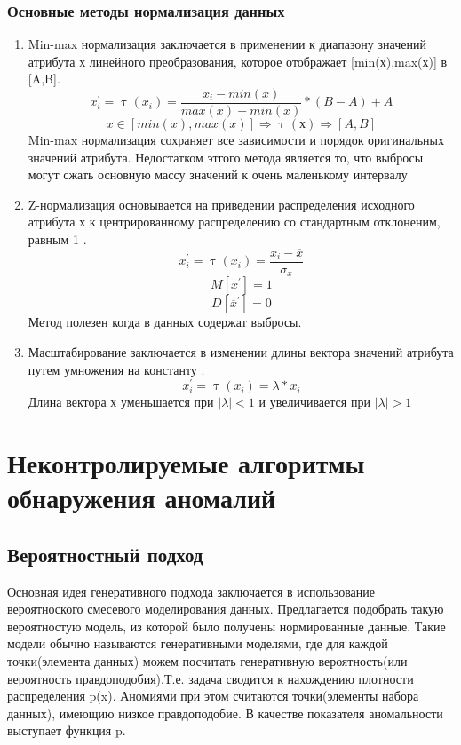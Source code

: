 \subsubsection{Основные методы нормализация данных}
\begin{enumerate}
	\item Min-max нормализация заключается в применении к диапазону значений атрибута х линейного преобразования, которое отображает [min(х),max(х)] в [A,B].
	\begin{equation}
	x^\prime_i=\uptau(x_i)=\frac{x_i - min(x)}{max(x) - min(x)}*(B-A) + A
		\end{equation}
   \begin{equation}
		x \in[min(x), max(x)] \Rightarrow \uptau(х) \Rightarrow [A,B]
	\end{equation}
	Min-max нормализация сохраняет все зависимости и порядок оригинальных значений атрибута. Недостатком этгого метода является то, что выбросы могут сжать основную массу значений к очень маленькому интервалу
	\item Z-нормализация  основывается на приведении распределения исходного атрибута х  к центрированному распределению со стандартным отклоненим, равным 1 \cite{Book06} .
	\begin{equation}
	x^\prime_i=\uptau(x_i) =\frac{x_i - \overline{x}}{\sigma_x}
		\end{equation}
		\begin{equation}
		M[x^\prime]=1	 
		\end{equation}
		\begin{equation}
		D[\overline{x}^\prime]=0	 
		\end{equation}
		Метод полезен когда в данных содержат выбросы.
	\item Масштабирование заключается в изменении длины вектора значений атрибута путем умножения на константу \cite{Book06} .
	\begin{equation}
	x^\prime_i=\uptau(x_i)=\lambda*x_i
	\end{equation}
	Длина вектора х уменьшается при $|\lambda|<1$ и увеличивается при $|\lambda|>1$ 
\end{enumerate}
\section{Неконтролируемые алгоритмы обнаружения аномалий}
\subsection{Вероятностный подход}
Основная идея генеративного подхода заключается в использование вероятноского смесевого моделирования данных. Предлагается подобрать такую вероятностую модель, из которой было получены нормированные данные. Такие модели обычно называются генеративными моделями, где для каждой точки(элемента данных) можем посчитать генеративную вероятность(или вероятность правдоподобия).Т.е. задача  сводится к нахождению плотности распределения p(x). Аномиями при этом  считаются точки(элементы набора данных), имеющию низкое правдоподобие. В качестве показателя аномальности выступает функция p.

